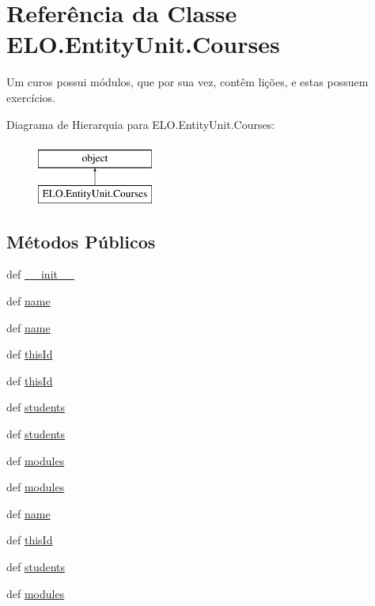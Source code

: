 \hypertarget{classELO_1_1EntityUnit_1_1Courses}{\section{Referência da Classe E\-L\-O.\-Entity\-Unit.\-Courses}
\label{d2/dc4/classELO_1_1EntityUnit_1_1Courses}
}


Um curos possui módulos, que por sua vez, contêm lições, e estas possuem exercícios.  


Diagrama de Hierarquia para E\-L\-O.\-Entity\-Unit.\-Courses\-:\begin{figure}[H]
\begin{center}
\leavevmode
\includegraphics[height=2.000000cm]{d2/dc4/classELO_1_1EntityUnit_1_1Courses}
\end{center}
\end{figure}
\subsection*{Métodos Públicos}
\begin{DoxyCompactItemize}
\item 
def \hyperlink{classELO_1_1EntityUnit_1_1Courses_a8e8a964217e8e2b76c3ebd889ed8ae1e}{\-\_\-\-\_\-init\-\_\-\-\_\-}
\item 
def \hyperlink{classELO_1_1EntityUnit_1_1Courses_a7b502c0d94108e3c474e5a0e2842cc1d}{name}
\item 
def \hyperlink{classELO_1_1EntityUnit_1_1Courses_a7b502c0d94108e3c474e5a0e2842cc1d}{name}
\item 
def \hyperlink{classELO_1_1EntityUnit_1_1Courses_a079f341a80c13005aec8764266f5c2f2}{this\-Id}
\item 
def \hyperlink{classELO_1_1EntityUnit_1_1Courses_a079f341a80c13005aec8764266f5c2f2}{this\-Id}
\item 
def \hyperlink{classELO_1_1EntityUnit_1_1Courses_ab1a0895decc2986339e0ab148922ad61}{students}
\item 
def \hyperlink{classELO_1_1EntityUnit_1_1Courses_ab1a0895decc2986339e0ab148922ad61}{students}
\item 
def \hyperlink{classELO_1_1EntityUnit_1_1Courses_a5d791876c321c20f5a698273613d0d01}{modules}
\item 
def \hyperlink{classELO_1_1EntityUnit_1_1Courses_a5d791876c321c20f5a698273613d0d01}{modules}
\item 
def \hyperlink{classELO_1_1EntityUnit_1_1Courses_a7b502c0d94108e3c474e5a0e2842cc1d}{name}
\item 
def \hyperlink{classELO_1_1EntityUnit_1_1Courses_a079f341a80c13005aec8764266f5c2f2}{this\-Id}
\item 
def \hyperlink{classELO_1_1EntityUnit_1_1Courses_ab1a0895decc2986339e0ab148922ad61}{students}
\item 
def \hyperlink{classELO_1_1EntityUnit_1_1Courses_a5d791876c321c20f5a698273613d0d01}{modules}
\end{DoxyCompactItemize}
